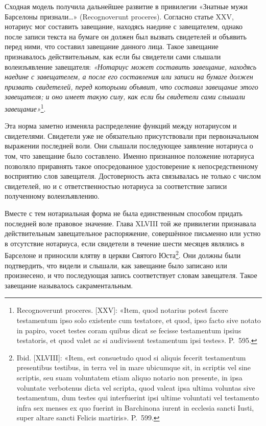 Сходная модель получила дальнейшее развитие в привилегии «Знатные мужи Барселоны признали…» (Recognoverunt proceres). Согласно статье XXV, нотариус мог составить завещание, находясь наедине с завещателем, однако после записи текста на бумаге он должен был вызвать свидетелей и объявить перед ними, что составил завещание данного лица. Такое завещание признавалось действительным, как если бы свидетели сами слышали волеизъявление завещателя: \emph{«Нотариус может составить завещание, находясь наедине с завещателем, а после его составления или записи на бумаге должен призвать свидетелей, перед которыми объявит, что составил завещание этого завещателя; и оно имеет такую силу, как если бы свидетели сами слышали завещание»}\footnote{Recognoverunt proceres. [XXV]: «Item, quod notarius potest facere testamentum ipso solo existente cum testatore, et quod, ipso facto sive notato in papiro, vocet testes coram quibus dicat se fecisse testamentum ipsius testatoris, et quod valet ac si audivissent testamentum ipsi testes». P.~595.}.

Эта норма заметно изменяла распределение функций между нотариусом и свидетелями. Свидетели уже не обязательно присутствовали при первоначальном выражении последней воли. Они слышали последующее заявление нотариуса о том, что завещание было составлено. Именно признанное положение нотариуса позволяло приравнять такое опосредованное удостоверение к непосредственному восприятию слов завещателя. Достоверность акта связывалась не только с числом свидетелей, но и с ответственностью нотариуса за соответствие записи полученному волеизъявлению.

Вместе с тем нотариальная форма не была единственным способом придать последней воле правовое значение. Глава XLVIII той же привилегии признавала действительным завещательное распоряжение, совершённое письменно или устно в отсутствие нотариуса, если свидетели в течение шести месяцев являлись в Барселоне и приносили клятву в церкви Святого Юста\footnote{Ibid. [XLVIII]: «Item, est consuetudo quod si aliquis fecerit testamentum presentibus testibus, in terra vel in mare ubicumque sit, in scriptis vel sine scriptis, seu suam voluntatem etiam aliquo notario non presente, in ipsa voluntate verbotenus dicta vel scripta, quod valeat ipsa ultima voluntas sive testamentum, dum testes qui interfuerint ipsi ultime voluntati vel testamento infra sex menses ex quo fuerint in Barchinona iurent in ecclesia sancti Iusti, super altare sancti Felicis martiris». P.~599.}. Они должны были подтвердить, что видели и слышали, как завещание было записано или произнесено, и что последующая запись соответствует словам завещателя. Такое завещание называлось сакраментальным.

